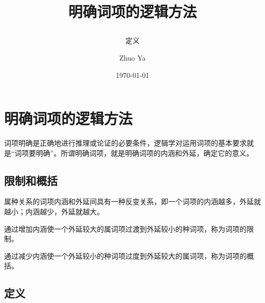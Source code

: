 \documentclass[
    a4paper,
    twoside
    ]{article}
\title{\zihao{2}\heiti 明确词项的逻辑方法 \\ \subtitle{定义}}
\author{Zhuo Ya}
\date{\today}
\newcommand\myemptypage{
    \null
    \thispagestyle{empty}
    \addtocounter{page}{-1}
    \newpage
}
\begin{document}
    \maketitle
    \thispagestyle{empty}

    \newpage

    \myemptypage

    \setcounter{page}{1}
    \cfoot{\thepage}
    \renewcommand{\footrulewidth}{1pt}
    \tableofcontents
    \newpage

    \setcounter{page}{1}


    \section{ 明确词项的逻辑方法 }
        {
            词项明确是正确地进行推理或论证的必要条件，逻辑学对运用词项的基本要求就是``词项要明确''。所谓明确词项，就是明确词项的内涵和外延，确定它的意义。
        }
        \subsection{限制和概括}
            
                属种关系的词项内涵和外延间具有一种反变关系，即一个词项的内涵越多，外延就越小；内涵越少，外延就越大。

                通过增加内涵使一个外延较大的属词项过渡到外延较小的种词项，称为词项的限制。

                通过减少内涵使一个外延较小的种词项过度到外延较大的属词项，称为词项的概括。

        \subsection{定义}
\end{document}
